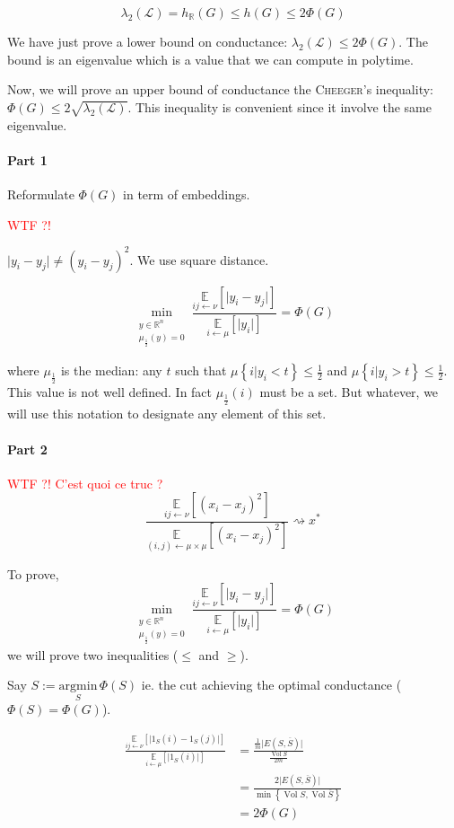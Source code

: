 \documentclass[12pt]{article}
\newcommand{\EE}{\mathbb{E}}
\newcommand{\RR}{\mathbb{R}}
\renewcommand{\L}{\mathcal{L}}
\newcommand{\set}[1]{\left\{ #1 \right\}}
\newcommand{\wtf}[1]{\Huge\textcolor{red}{WTF ?! #1}\normalsize}
\newcommand{\argmin}{\text{argmin}}
\newcommand{\la}{\leftarrow}
\newcommand{\esp}[2][]{\underset{#1}{\EE}\left[ #2 \right]}
\DeclareMathOperator{\vol}{Vol}
\begin{document}
\[
    \lambda_2(\L) = h_\RR(G) \leqslant h(G) \leqslant 2\Phi(G)
\]

We have just prove a lower bound on conductance: $\lambda_2(\L) \leqslant 2\Phi(G)$. The bound is an eigenvalue which is a value that we can compute in polytime.

Now, we will prove an upper bound of conductance the \textsc{Cheeger}'s inequality: $\Phi(G) \leqslant 2\sqrt{\lambda_2(\L)}$. This inequality is convenient since it involve the same eigenvalue.

\paragraph{Part 1}

Reformulate $\Phi(G)$ in term of embeddings.

\wtf{}

$\lvert y_i -y_j \rvert \neq (y_i-y_j)^2$. We use square distance.

\[
    \min\limits_{\substack{y\in\RR^n\\\mu_{\frac{1}{2}}(y)=0}} \frac{\esp[ij\la\nu]{\lvert y_i-y_j\rvert}}{\esp[i\la\mu]{\lvert y_i \rvert}} = \Phi(G)
\]

where $\mu_{\frac{1}{2}}$ is the median: any $t$ such that $\mu\set{i\vert y_i < t} \leqslant \frac{1}{2}$ and $\mu\set{i\vert y_i >t} \leqslant \frac{1}{2}$. This value is not well defined. In fact $\mu_{\frac{1}{2}}(i)$ must be a set. But whatever, we will use this notation to designate any element of this set.


\paragraph{Part 2}
\wtf{C'est quoi ce truc ?}
\[
    \frac{\esp[ij\la\nu]{(x_i-x_j)^2}}{\esp[(i,j)\la\mu\times\mu]{(x_i-x_j)^2}} \rightsquigarrow x^*
\]



To prove,
\[
    \min\limits_{\substack{y\in\RR^n\\\mu_{\frac{1}{2}}(y)=0}} \frac{\esp[ij\la\nu]{\lvert y_i-y_j\rvert}}{\esp[i\la\mu]{\lvert y_i \rvert}} = \Phi(G)
\]
we will prove two inequalities ($\leqslant$ and $\geqslant$).

\bigskip

Say $S:=\underset{S}{\argmin}\,\Phi(S)$ ie. the cut achieving the optimal conductance ($\Phi(S) = \Phi(G)$).

\[
    \begin{aligned}
        \frac{\esp[ij\la\nu]{\lvert1_S(i)-1_S(j)\rvert}}{\esp[i\la\mu]{\lvert 1_S(i)\rvert}} &= \frac{\frac{1}{m}\lvert E(S,\overline{S})\rvert}{\frac{\vol S}{2m}}\\
        &= \frac{2\lvert E(S,\overline{S}) \rvert}{\min\set{\vol S, \vol \overline{S}}}\\
        &= 2 \Phi(G)
    \end{aligned}
\]
\end{document}
